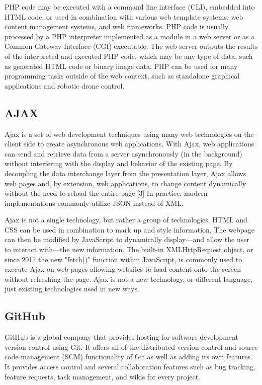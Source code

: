 \documentclass[12pt]{article}
\begin{document}
PHP code may be executed with a command line interface (CLI), embedded into HTML code, or used in combination with various web template systems, web content management systems, and web frameworks. PHP code is usually processed by a PHP interpreter implemented as a module in a web server or as a Common Gateway Interface (CGI) executable. The web server outputs the results of the interpreted and executed PHP code, which may be any type of data, such as generated HTML code or binary image data. PHP can be used for many programming tasks outside of the web context, such as standalone graphical applications and robotic drone control.

\subsection{AJAX}
Ajax is a set of web development techniques using many web technologies on the client side to create asynchronous web applications. With Ajax, web applications can send and retrieve data from a server asynchronously (in the background) without interfering with the display and behavior of the existing page. By decoupling the data interchange layer from the presentation layer, Ajax allows web pages and, by extension, web applications, to change content dynamically without the need to reload the entire page.[3] In practice, modern implementations commonly utilize JSON instead of XML.

Ajax is not a single technology, but rather a group of technologies. HTML and CSS can be used in combination to mark up and style information. The webpage can then be modified by JavaScript to dynamically display—and allow the user to interact with—the new information. The built-in XMLHttpRequest object, or since 2017 the new "fetch()" function within JavaScript, is commonly used to execute Ajax on web pages allowing websites to load content onto the screen without refreshing the page. Ajax is not a new technology, or different language, just existing technologies used in new ways.

\subsection{GitHub}
GitHub is a global company that provides hosting for software development version control using Git. It offers all of the distributed version control and source code management (SCM) functionality of Git as well as adding its own features. It provides access control and several collaboration features such as bug tracking, feature requests, task management, and wikis for every project.
\end{document}
